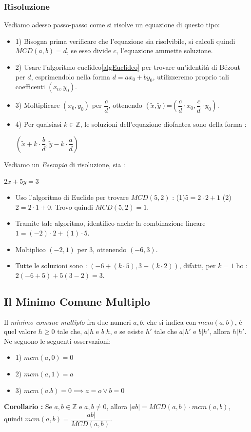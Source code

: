 \documentclass[12pt, letterpaper]{article}
\begin{document}
\subsubsection{Risoluzione}
Vediamo adesso passo-passo come si risolve un equazione di questo tipo:
\begin{itemize}
    \item 1) Bisogna prima verificare che l'equazione sia risolvibile, si calcoli quindi \(MCD(a,b)=d\), se esso 
    divide \(c\), l'equazione ammette soluzione.
    \item 2) Usare l'algoritmo euclideo\ref{algEuclideo} per trovare un'identità di Bézout per \(d\), esprimendolo 
    nella forma \(d=ax_0+by_0\), utilizzeremo proprio tali coefficenti \((x_0,y_0)\). 
    \item 3) Moltiplicare \((x_0,y_0)\) per \(\dfrac{c}{d}\), ottenendo \((\tilde x,\tilde y)\)=\((\dfrac{c}{d}\cdot x_0,\dfrac{c}{d}\cdot y_0)\).
    \item 4) Per qualsiasi \(k\in\mathbb{Z}\), le soluzioni dell'equazione diofantea sono della forma : \begin{center}
        \((\tilde x+k\cdot \dfrac{b}{d},\tilde y-k\cdot \dfrac{a}{d})\)
    \end{center}
\end{itemize}
Vediamo un \textit{Esempio} di risoluzione, sia :
\begin{center}
    \(2x+5y=3\)
\end{center}
\begin{itemize}
    \item Uso l'algoritmo di Euclide per trovare \(MCD(5,2)\) : (1)\(5=2\cdot 2 +1\)   (2)\(2=2\cdot 1 +0\). 
    Trovo quindi \(MCD(5,2)=1\).
    \item Tramite tale algoritmo, identifico anche la combinazione lineare \(1=(-2)\cdot2+(1)\cdot 5\).
    \item Moltiplico \((-2,1)\) per \(3\), ottenendo \((-6,3)\).
    \item Tutte le soluzioni sono : \((-6+(k\cdot 5),3-(k\cdot2))\), difatti, per \(k=1\) ho : \(2(-6+5)+5(3-2)=3\).
\end{itemize}
\subsection{Il Minimo Comune Multiplo}
Il \textit{minimo comune multiplo} fra due numeri \(a,b\), che si indica con \(mcm(a,b)\), è quel valore \(h\ge0\) tale che,
\(a|h\) e \(b|h\), e se esiste \(h'\) tale che \(a|h'\) e \(b|h'\), allora \(h|h'\). Ne seguono le seguenti 
osservazioni:\begin{itemize}
    \item 1) \(mcm(a,0)=0\)
    \item 2) \(mcm(a,1)=a\)
    \item 3) \(mcm(a.b)=0\implies a=o\lor b=0\)
\end{itemize}
\textbf{Corollario :} Se \(a,b\in\mathbb{Z}\) e \(a,b\ne 0\), allora \(|ab|=MCD(a,b)\cdot mcm(a,b)\), quindi \(mcm(a,b)=\dfrac{|ab|}{MCD(a,b)}\).
\end{document}
